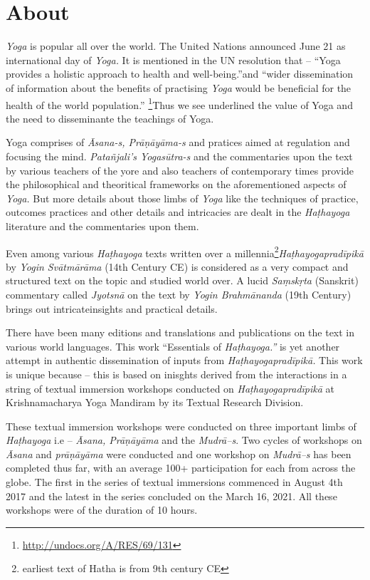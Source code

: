 \thispagestyle{empty}

\chapter*{About}\label{about}

\textit{Yoga} is popular all over the world. The United Nations announced June 21 as international day of \textit{Yoga.} It is mentioned in the UN resolution that – “Yoga provides a holistic approach to health and well-being.”and “wider dissemination of information about the benefits of practising \textit{Yoga} would be beneficial for the health of the world population.” \footnote{\url{http://undocs.org/A/RES/69/131}}Thus we see underlined the value of Yoga and the need to disseminante the teachings of Yoga.
\medskip

Yoga comprises of \textit{Āsana-s, Prāṇāyāma-s} and pratices aimed at regulation and focusing the mind. \textit{Patañjali's Yogasūtra-s} and the commentaries upon the text by various teachers of the yore and also teachers of contemporary times provide the philosophical and theoritical frameworks on the aforementioned aspects of \textit{Yoga.} But more details about those limbs of \textit{Yoga} like the techniques of practice, outcomes practices and other details and intricacies are dealt in the \textit{Haṭhayoga} literature and the commentaries upon them.
\medskip

Even among various \textit{Haṭhayoga} texts written over a millennia\footnote{earliest text of Hatha is from 9th century CE}\break \textit{Haṭhayogapradīpikā} by \textit{Yogin Svātmārāma} (14th Century CE) is considered as a very compact and structured text on the topic and studied world over. A lucid \textit{Saṃskṛta} (Sanskrit) commentary called \textit{Jyotsnā} on the text by \textit{Yogin Brahmānanda} (19th Century) brings out intricate\break insights and practical details. 
\medskip

There have been many editions and translations and publications on the text in various world languages. This work “Essentials of \textit{Haṭhayoga.”} is yet another attempt in authentic dissemination of inputs from \textit{Haṭhayogapradīpikā.} This work is unique because – this is based on inisghts derived from the interactions in a string of textual immersion workshops conducted on \textit{Haṭhayogapradīpikā} at Krishnamacharya Yoga Mandiram by its Textual Research Division. 
\medskip

These textual immersion workshops were conducted on three important limbs of \textit{Haṭhayoga} i.e – \textit{Āsana, Prāṇāyāma} and the \textit{Mudrā–s}. Two cycles of workshops on \textit{Āsana} and \textit{prāṇāyāma} were conducted and one workshop on \textit{Mudrā–s} has been completed thus far, with an average 100+ participation for each from across the globe. The first in the series of textual immersions commenced in August 4th 2017 and the latest in the series concluded on the March 16, 2021. All these workshops were of the duration of 10 hours.
\medskip

